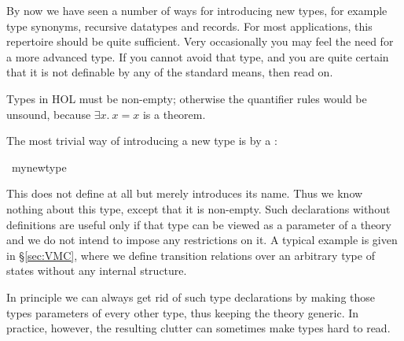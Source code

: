 %
\begin{isabellebody}%
\def\isabellecontext{Typedef}%
%
%
\begin{isamarkuptext}%
\label{sec:adv-typedef}
By now we have seen a number of ways for introducing new types, for example
type synonyms, recursive datatypes and records. For most applications, this
repertoire should be quite sufficient. Very occasionally you may feel the
need for a more advanced type. If you cannot avoid that type, and you are
quite certain that it is not definable by any of the standard means,
then read on.
\begin{warn}
  Types in HOL must be non-empty; otherwise the quantifier rules would be
  unsound, because $\exists x.\ x=x$ is a theorem.
\end{warn}%
\end{isamarkuptext}%
%
%
\begin{isamarkuptext}%
\label{sec:typedecl}
The most trivial way of introducing a new type is by a :%
\end{isamarkuptext}%
\ my{\isacharunderscore}new{\isacharunderscore}type%
\begin{isamarkuptext}%
\noindent{}%
This does not define  at all but merely introduces its
name. Thus we know nothing about this type, except that it is
non-empty. Such declarations without definitions are
useful only if that type can be viewed as a parameter of a theory and we do
not intend to impose any restrictions on it. A typical example is given in
\S\ref{sec:VMC}, where we define transition relations over an arbitrary type
of states without any internal structure.

In principle we can always get rid of such type declarations by making those
types parameters of every other type, thus keeping the theory generic. In
practice, however, the resulting clutter can sometimes make types hard to
read.


\end{isamarkuptext}
\end{isabellebody}
